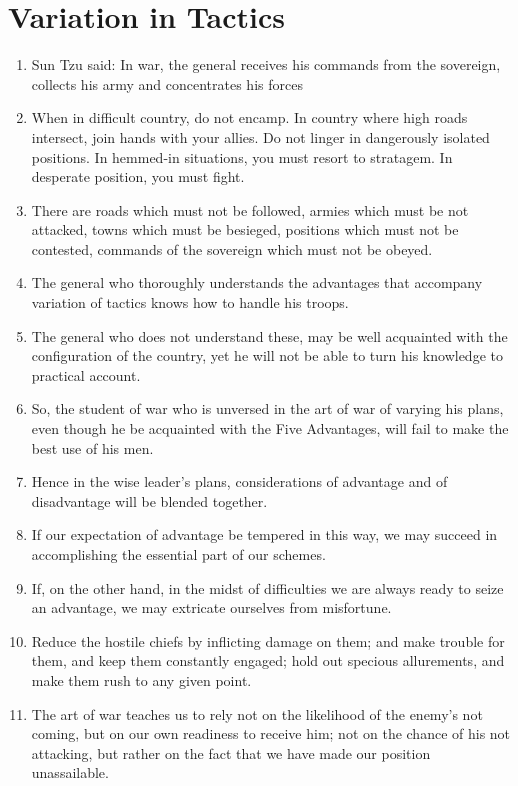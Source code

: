 \documentclass[oneside]{book}
\begin{document}
\chapter{Variation in Tactics}
\begin{enumerate}
	\item Sun Tzu said: In war, the general receives his commands from the sovereign, collects his army and concentrates his forces
	\item When in difficult country, do not encamp. In country where high roads intersect, join hands with your allies. Do not linger in dangerously isolated positions. In hemmed-in situations, you must resort to stratagem. In desperate position, you must fight.
	\item There are roads which must not be followed, armies which must be not attacked, towns which must be besieged, positions which must not be contested, commands of the sovereign which must not be obeyed.
	\item The general who thoroughly understands the advantages that accompany variation of tactics knows how to handle his troops.
	\item The general who does not understand these, may be well acquainted with the configuration of the country, yet he will not be able to turn his knowledge to practical account.
	\item So, the student of war who is unversed in the art of war of varying his plans, even though he be acquainted with the Five Advantages, will fail to make the best use of his men.
	\item Hence in the wise leader's plans, considerations of advantage and of disadvantage will be blended together.
	\item If our expectation of advantage be tempered in this way, we may succeed in accomplishing the essential part of our schemes.
	\item If, on the other hand, in the midst of difficulties we are always ready to seize an advantage, we may extricate ourselves from misfortune.
	\item Reduce the hostile chiefs by inflicting damage on them; and make trouble for them, and keep them constantly engaged; hold out specious allurements, and make them rush to any given point.
	\item The art of war teaches us to rely not on the likelihood of the enemy's not coming, but on our own readiness to receive him; not on the chance of his not attacking, but rather on the fact that we have made our position unassailable.

\end{enumerate}
\end{document}
